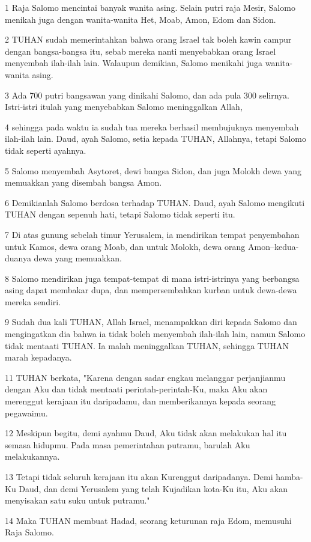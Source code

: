 \par 1 Raja Salomo mencintai banyak wanita asing. Selain putri raja Mesir, Salomo menikah juga dengan wanita-wanita Het, Moab, Amon, Edom dan Sidon.
\par 2 TUHAN sudah memerintahkan bahwa orang Israel tak boleh kawin campur dengan bangsa-bangsa itu, sebab mereka nanti menyebabkan orang Israel menyembah ilah-ilah lain. Walaupun demikian, Salomo menikahi juga wanita-wanita asing.
\par 3 Ada 700 putri bangsawan yang dinikahi Salomo, dan ada pula 300 selirnya. Istri-istri itulah yang menyebabkan Salomo meninggalkan Allah,
\par 4 sehingga pada waktu ia sudah tua mereka berhasil membujuknya menyembah ilah-ilah lain. Daud, ayah Salomo, setia kepada TUHAN, Allahnya, tetapi Salomo tidak seperti ayahnya.
\par 5 Salomo menyembah Asytoret, dewi bangsa Sidon, dan juga Molokh dewa yang memuakkan yang disembah bangsa Amon.
\par 6 Demikianlah Salomo berdosa terhadap TUHAN. Daud, ayah Salomo mengikuti TUHAN dengan sepenuh hati, tetapi Salomo tidak seperti itu.
\par 7 Di atas gunung sebelah timur Yerusalem, ia mendirikan tempat penyembahan untuk Kamos, dewa orang Moab, dan untuk Molokh, dewa orang Amon--kedua-duanya dewa yang memuakkan.
\par 8 Salomo mendirikan juga tempat-tempat di mana istri-istrinya yang berbangsa asing dapat membakar dupa, dan mempersembahkan kurban untuk dewa-dewa mereka sendiri.
\par 9 Sudah dua kali TUHAN, Allah Israel, menampakkan diri kepada Salomo dan mengingatkan dia bahwa ia tidak boleh menyembah ilah-ilah lain, namun Salomo tidak mentaati TUHAN. Ia malah meninggalkan TUHAN, sehingga TUHAN marah kepadanya.
\par 11 TUHAN berkata, "Karena dengan sadar engkau melanggar perjanjianmu dengan Aku dan tidak mentaati perintah-perintah-Ku, maka Aku akan merenggut kerajaan itu daripadamu, dan memberikannya kepada seorang pegawaimu.
\par 12 Meskipun begitu, demi ayahmu Daud, Aku tidak akan melakukan hal itu semasa hidupmu. Pada masa pemerintahan putramu, barulah Aku melakukannya.
\par 13 Tetapi tidak seluruh kerajaan itu akan Kurenggut daripadanya. Demi hamba-Ku Daud, dan demi Yerusalem yang telah Kujadikan kota-Ku itu, Aku akan menyisakan satu suku untuk putramu."
\par 14 Maka TUHAN membuat Hadad, seorang keturunan raja Edom, memusuhi Raja Salomo.
